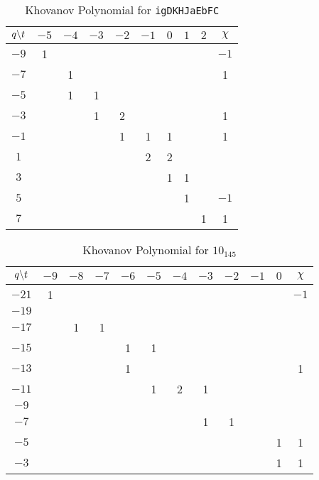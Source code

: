 \documentclass{article}
\theoremstyle{plain}
\begin{document}
        \begin{table}
            \centering
            \begin{tabular}{| c | c | c | c | c | c | c | c | c | c |}
                \hline
                $q\symbol{92}t$&$-5$&$-4$&$-3$&$-2$&$-1$&$0$&$1$&$2$&$\chi$\\
                \hline
                $-9$&1&&&&&&&&$-1$\\
                \hline
                $-7$&&1&&&&&&&1\\
                \hline
                $-5$&&1&1&&&&&&\\
                \hline
                $-3$&&&1&2&&&&&1\\
                \hline
                $-1$&&&&1&1&1&&&1\\
                \hline
                $1$&&&&&2&2&&&\\
                \hline
                $3$&&&&&&1&1&&\\
                \hline
                $5$&&&&&&&1&&$-1$\\
                \hline
                $7$&&&&&&&&1&1\\
                \hline
            \end{tabular}
            \caption{Khovanov Polynomial for \texttt{igDKHJaEbFC}}
        \end{table}
        \begin{table}
            \centering
            \begin{tabular}{| c | c | c | c | c | c | c | c | c | c | c | c |}
                \hline
                $q\symbol{92}t$&$-9$&$-8$&$-7$&$-6$&$-5$&$-4$&$-3$&$-2$&$-1$&$0$&$\chi$\\
                \hline
                $-21$&1&&&&&&&&&&$-1$\\
                \hline
                $-19$&&&&&&&&&&&\\
                \hline
                $-17$&&1&1&&&&&&&&\\
                \hline
                $-15$&&&&1&1&&&&&&\\
                \hline
                $-13$&&&&1&&&&&&&1\\
                \hline
                $-11$&&&&&1&2&1&&&&\\
                \hline
                $-9$&&&&&&&&&&&\\
                \hline
                $-7$&&&&&&&1&1&&&\\
                \hline
                $-5$&&&&&&&&&&1&1\\
                \hline
                $-3$&&&&&&&&&&1&1\\
                \hline
            \end{tabular}
            \caption{Khovanov Polynomial for $10_{145}$}
        \end{table}
\end{document}
